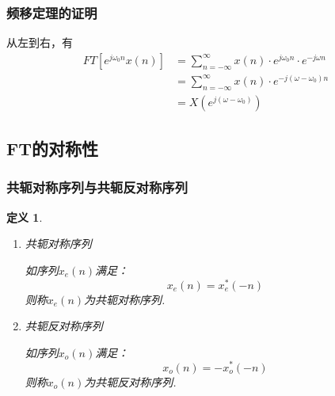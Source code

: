\documentclass[notheorems,compress,mathserif,table]{beamer}
\newtheorem{definition}{定义}
\begin{document}
\begin{frame}[shrink]\frametitle{频移定理的证明}%
从左到右，有
\begin{equation*}
\begin{split}
FT[e^{j\omega_{0}n}x(n)]
&= \sum_{n=-\infty}^{\infty}x(n)\cdot e^{j\omega_{0}n}\cdot e^{-j\omega n}\\
&= \sum_{n=-\infty}^{\infty}x(n)\cdot e^{-j(\omega-\omega_{0})n}\\
&= X(e^{j(\omega-\omega_{0})})
\end{split}
\end{equation*}

\end{frame}
\subsection*{FT的对称性}
\begin{frame}\frametitle{共轭对称序列与共轭反对称序列}%
\begin{definition}
\begin{enumerate}
\item [(1)] 共轭对称序列\par\qquad
如序列$x_{e}(n)$满足：
$$x_{e}(n) = x_{e}^{*}(-n)$$
\qquad 则称$x_{e}(n)$为共轭对称序列.
\item [(2)] 共轭反对称序列\par\qquad
如序列$x_{o}(n)$满足：
$$x_{o}(n) = -x_{o}^{*}(-n)$$
\qquad 则称$x_{o}(n)$为共轭反对称序列.
\end{enumerate}
\end{definition}
\end{frame}
\end{document}
